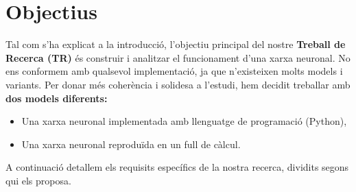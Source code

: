 \chapter{Objectius}

\label{c:objectius}

Tal com s’ha explicat a la introducció, l’objectiu principal del nostre \textbf{Treball de Recerca (TR)} és construir i analitzar el funcionament d’una xarxa neuronal. No ens conformem amb qualsevol implementació, ja que n’existeixen molts models i variants. Per donar més coherència i solidesa a l’estudi, hem decidit treballar amb \textbf{dos models diferents:}

\begin{itemize}

    \item Una xarxa neuronal implementada amb llenguatge de programació (Python),

    \item Una xarxa neuronal reproduïda en un full de càlcul.

\end{itemize}

A continuació detallem els requisits específics de la nostra recerca, dividits segons qui els proposa.

